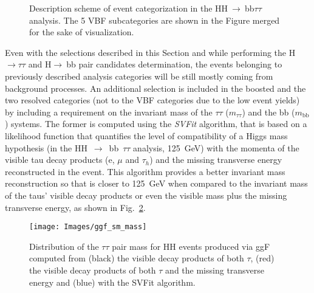 \documentclass[../main.tex]{subfiles}
\begin{document}
\begin{figure}[h!]
\begin{center}
\end{center}
\caption{Description scheme of event categorization in the HH$~\to~$bb$\tau\tau$ analysis. The 5 VBF subcategories are shown in the Figure merged for the sake of visualization.}
\label{hh:fig:categorization}
\end{figure}


Even with the selections described in this Section and while performing the H$\to\tau\tau$ and H$\to~$bb pair candidates determination, the events belonging to previously described analysis categories will be still mostly coming from background processes. An additional selection is included in the boosted and the two resolved categories (not to the VBF categories due to the low event yields) by including a requirement on the invariant mass of the $\tau\tau$ ($m_{\tau\tau}$) and the bb ($m_{\text{bb}}$) systems. The former is computed using the \textit{SVFit} \cite{hh:analysis:svfit} algorithm, that is based on a likelihood function that quantifies the level of compatibility of a Higgs mass hypothesis (in the HH~$\to$~bb~$\tau\tau$ analysis, 125~GeV) with the momenta of the visible tau decay products (e, $\mu$ and $\tau_h$) and the missing transverse energy reconstructed in the event. This algorithm provides a better invariant mass reconstruction so that is closer to 125~GeV when compared to the invariant mass of the taus' visible decay products or even the visible mass plus the missing transverse energy, as shown in Fig.~\ref{hh:fig:htt_masses}. 


\begin{figure}[h!]
\begin{center}
\texttt{[image: Images/ggf\_sm\_mass]}
\end{center}
\caption{Distribution of the $\tau\tau$ pair mass for HH events produced via ggF computed from (black) the visible decay products of both $\tau$, (red) the visible decay products of both $\tau$ and the missing transverse energy and (blue) with the SVFit algorithm.}
\label{hh:fig:htt_masses}
\end{figure}
\end{document}
